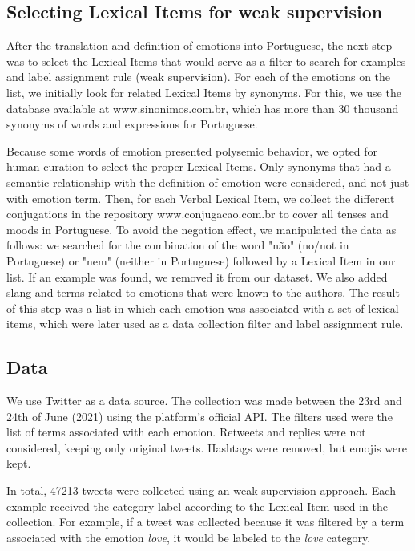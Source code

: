 \documentclass[12pt]{article}
\begin{document}
\subsection{Selecting Lexical Items for weak supervision }
After the translation and definition of emotions into Portuguese, the next step was to select the Lexical Items that would serve as a filter to search for examples and label assignment rule (weak supervision). For each of the emotions on the list, we initially look for related Lexical Items by synonyms. For this, we use the database available at www.sinonimos.com.br, which has more than 30 thousand synonyms of words and expressions for Portuguese.

Because some words of emotion presented polysemic behavior, we opted for human curation to select the proper Lexical Items. Only synonyms that had a semantic relationship with the definition of emotion were considered, and not just with emotion term. Then, for each Verbal Lexical Item, we collect the different conjugations in the repository www.conjugacao.com.br to cover all tenses and moods in Portuguese. To avoid the negation effect, we manipulated the data as follows: we searched for the combination of the word "não" (no/not in Portuguese) or "nem" (neither in Portuguese) followed by a Lexical Item in our list. If an example was found, we removed it from our dataset. We also added slang and terms related to emotions that were known to the authors. The result of this step was a list in which each emotion was associated with a set of lexical items, which were later used as a data collection filter and label assignment rule.

\subsection{Data}

We use Twitter as a data source. The collection was made between the 23rd and 24th of June (2021) using the platform's official API. The filters used were the list of terms associated with each emotion. Retweets and replies were not considered, keeping only original tweets. Hashtags were removed, but emojis were kept.

In total, 47213 tweets were collected using an weak supervision approach. Each example received the category label according to the Lexical Item used in the collection. For example, if a tweet was collected because it was filtered by a term associated with the emotion \textit{love}, it would be labeled to the \textit{love} category.
\end{document}

